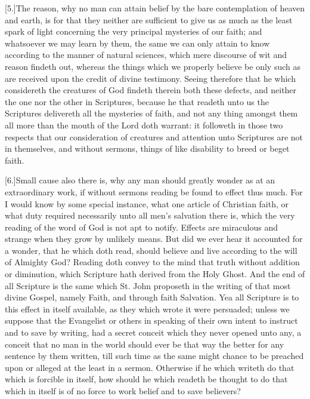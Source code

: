 [5.]The reason, why no man can attain belief by the bare contemplation of heaven and earth, is for that they neither are sufficient to give us as much as the least spark of light concerning the very principal mysteries of our faith; and whatsoever we may learn by them, the same we can only attain to know according to the manner of natural sciences, which mere discourse of wit and reason findeth out, whereas the things which we properly believe be only such as are received upon the credit of divine testimony. Seeing therefore that he which considereth the creatures of God findeth therein both these defects, and neither the one nor the other in Scriptures, because he that readeth unto us the Scriptures delivereth all the mysteries of faith, and not any thing amongst them all more than the mouth of the Lord doth warrant: it followeth in those two respects that our consideration of creatures and attention unto Scriptures are not in themselves, and without sermons, things of like disability to breed or beget faith.

[6.]Small cause also there is, why any man should greatly wonder as at an extraordinary work, if without sermons reading be found to effect thus much. For I would know by some special instance, what one article of Christian faith, or what duty required necessarily unto all men’s salvation there is, which the very reading of the word of God is not apt to notify. Effects are miraculous and strange when they grow by unlikely means. But did we ever hear it accounted for a wonder, that he which doth read, should believe and live according to the will of Almighty God? Reading doth convey to the  mind that truth without addition or diminution, which Scripture hath derived from the Holy Ghost.
 And the end of all Scripture is the same which St. John proposeth in the writing of that most divine Gospel, namely Faith, and through faith Salvation. Yea all Scripture is to this effect in itself available, as they which wrote it were persuaded; unless we suppose that the Evangelist or others in speaking of their own intent to instruct and to save by writing, had a secret conceit which they never opened unto any, a conceit that no man in the world should ever be that way the better for any sentence by them written, till such time as the same might chance to be preached upon or alleged at the least in a sermon. Otherwise if he which writeth do that which is forcible in itself, how should he which readeth be thought to do that which in itself is of no force to work belief and to save believers?

